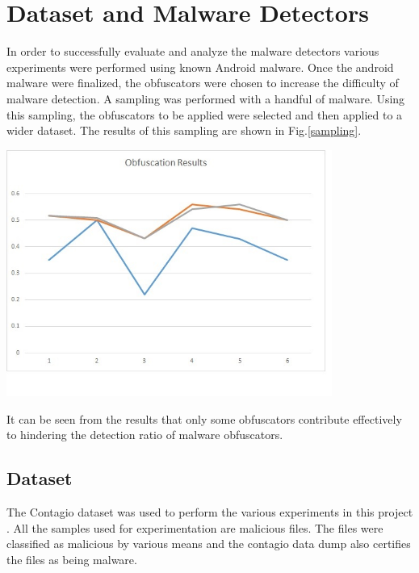 \chapter{Dataset and Malware Detectors}

In order to successfully evaluate and analyze the malware detectors various experiments were performed using known Android malware. Once the android malware were finalized, the obfuscators were chosen to increase the difficulty of malware detection. A sampling was performed with a handful of malware. Using this sampling, the obfuscators to be applied were selected and then applied to a wider dataset. The results of this sampling are shown in Fig.\ref{sampling}.
 
 	 \vspace{3mm}
 	 \begin{center}
 	 	\includegraphics[width=0.8\textwidth]{sampling.jpg}
 	 	\label{sampling}
 	 \end{center}
 	 \vspace{3mm}
 
 It can be seen from the results that only some obfuscators contribute effectively to hindering the detection ratio of malware obfuscators.
 
 \section{Dataset}
	 The Contagio dataset was used to perform the various experiments in this project \cite{contagio}. All the samples used for experimentation are malicious files. The files were classified as malicious by various means and the contagio data dump also certifies the files as being malware.
	 
